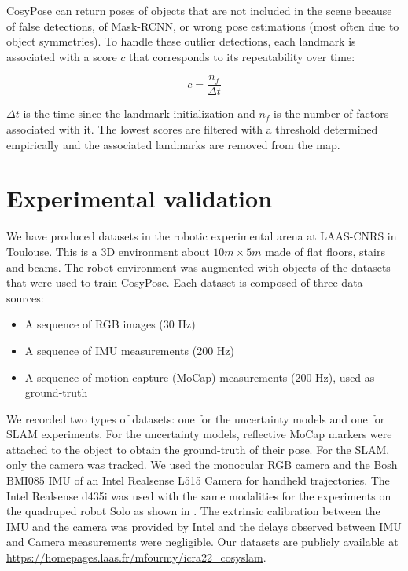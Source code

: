 CosyPose can return poses of objects that are not included in the scene because of false detections, of Mask-RCNN, or wrong pose estimations (most often due to object symmetries). 
To handle these outlier detections, each landmark is associated with a score $c$ that corresponds to its repeatability over time: 

\begin{equation}
    c = \frac{n_f}{\Delta t}
\end{equation}

$\Delta t$ is the time since the landmark initialization and $n_f$ is the number of factors associated with it.
The lowest scores are filtered with a threshold determined empirically and the associated landmarks are removed from the map.




\section{Experimental validation}

We have produced datasets in the robotic experimental arena at LAAS-CNRS in Toulouse. This is a 3D environment about $10 m \times 5m$ made of flat floors, 
stairs and beams. The robot environment was augmented with objects of the datasets that were used to train CosyPose. Each dataset is composed of three data sources:

\begin{itemize}
    \item A sequence of RGB images (30 Hz)
    \item A sequence of IMU measurements (200 Hz)
    \item A sequence of motion capture (MoCap) measurements (200 Hz), used as ground-truth 
\end{itemize}

We recorded two types of datasets: one for the uncertainty models and one for SLAM experiments. For the uncertainty models, reflective MoCap markers 
were attached to the object to obtain the ground-truth of their pose. For the SLAM, only the camera was tracked. We used the monocular RGB camera and the Bosh BMI085 
IMU of an Intel Realsense L515 Camera for handheld trajectories. The Intel Realsense d435i was used with the same modalities 
for the experiments on the quadruped robot Solo \cite{grimminger2020open} as shown in . 
The extrinsic calibration between the IMU and the camera was provided by Intel and the delays observed between IMU and Camera measurements were negligible. 
Our datasets are publicly available at \url{https://homepages.laas.fr/mfourmy/icra22_cosyslam}.





